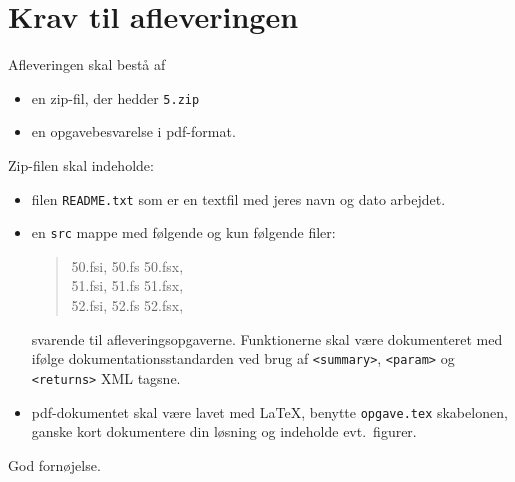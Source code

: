 \documentclass[a4paper,12pt]{article}
\newcommand{\exerciseNumber}{5}
\begin{document}
\section*{Krav til afleveringen}
Afleveringen skal bestå af
\begin{itemize}
  \item en zip-fil, der hedder \texttt{\exerciseNumber\typeLetter.zip}
  \item en opgavebesvarelse i pdf-format.
\end{itemize}
Zip-filen skal indeholde:
\begin{itemize}
\item filen \texttt{README.txt} som er en textfil med jeres navn og dato arbejdet.
\item en \texttt{src} mappe med følgende og kun
  følgende filer:
  \begin{quote}
    \exerciseNumber\typeLetter0.fsi, \exerciseNumber\typeLetter0.fs \exerciseNumber\typeLetter0.fsx,\\
    \exerciseNumber\typeLetter1.fsi, \exerciseNumber\typeLetter1.fs \exerciseNumber\typeLetter1.fsx,\\
    \exerciseNumber\typeLetter2.fsi, \exerciseNumber\typeLetter2.fs \exerciseNumber\typeLetter2.fsx,\\
  \end{quote}
  svarende til afleveringsopgaverne. Funktionerne skal være dokumenteret med ifølge dokumentationsstandarden ved brug af \verb|<summary>|, \verb|<param>| og \verb|<returns>| XML tagsne.
  \item pdf-dokumentet skal være lavet med \LaTeX, benytte \lstinline[language=console]{opgave.tex} skabelonen, ganske kort dokumentere din løsning og indeholde evt.\ figurer.
\end{itemize}

\flushright God fornøjelse.
\end{document}
